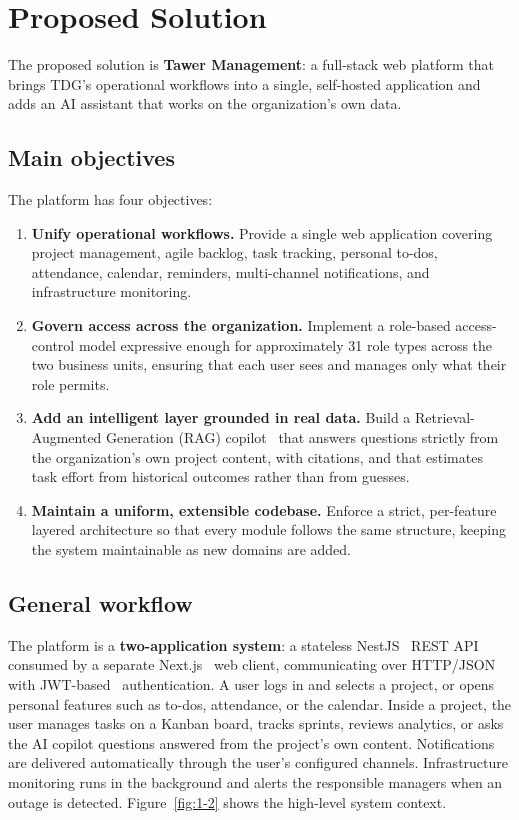 \section{Proposed Solution}

The proposed solution is \textbf{Tawer Management}: a full-stack web platform that brings
TDG's operational workflows into a single, self-hosted application and adds an AI assistant
that works on the organization's own data.

\subsection{Main objectives}

The platform has four objectives:

\begin{enumerate}
  \item \textbf{Unify operational workflows.} Provide a single web application covering project
    management, agile backlog, task tracking, personal to-dos, attendance, calendar, reminders,
    multi-channel notifications, and infrastructure monitoring.
  \item \textbf{Govern access across the organization.} Implement a role-based access-control
    model expressive enough for approximately 31 role types across the two business units,
    ensuring that each user sees and manages only what their role permits.
  \item \textbf{Add an intelligent layer grounded in real data.} Build a Retrieval-Augmented
    Generation (RAG) copilot~\cite{lewis2020rag} that answers questions strictly from the
    organization's own project content, with citations, and that estimates task effort from
    historical outcomes rather than from guesses.
  \item \textbf{Maintain a uniform, extensible codebase.} Enforce a strict, per-feature layered
    architecture so that every module follows the same structure, keeping the system
    maintainable as new domains are added.
\end{enumerate}

\subsection{General workflow}

The platform is a \textbf{two-application system}: a stateless NestJS~\cite{nestjs} REST API
consumed by a separate Next.js~\cite{nextjs} web client, communicating over HTTP/JSON with
JWT-based~\cite{jwt} authentication. A user logs in and selects a project, or opens personal
features such as to-dos, attendance, or the calendar. Inside a project, the user manages tasks
on a Kanban board, tracks sprints, reviews analytics, or asks the AI copilot questions answered
from the project's own content. Notifications are delivered automatically through the user's
configured channels. Infrastructure monitoring runs in the background and alerts the
responsible managers when an outage is detected.
Figure~\ref{fig:1-2} shows the high-level system context.

